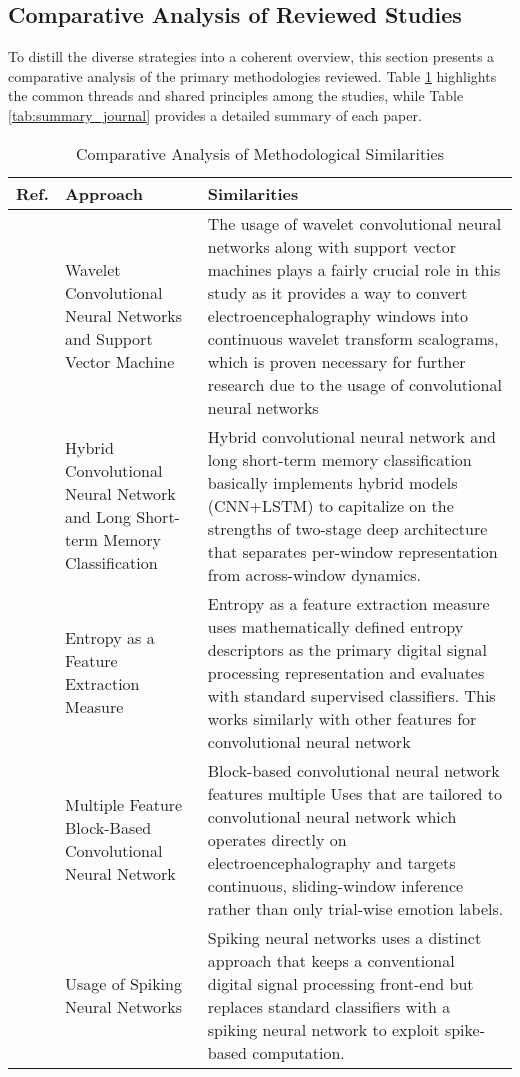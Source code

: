 \documentclass[conference]{IEEEtran}
\begin{document}
\subsection{Comparative Analysis of Reviewed Studies}
To distill the diverse strategies into a coherent overview, this section presents a comparative analysis of the primary methodologies reviewed. Table \ref{tab:method_similarities} highlights the common threads and shared principles among the studies, while Table \ref{tab:summary_journal} provides a detailed summary of each paper.

\begin{table}[htbp]
\centering
\scriptsize
\caption{Comparative Analysis of Methodological Similarities}
\label{tab:method_similarities}
\renewcommand{\arraystretch}{2}
\begin{tabular}{p{1.5cm}p{2.5cm}p{4cm}}
\hline
\textbf{Ref.} & \textbf{Approach} & \textbf{Similarities} \\
\hline
\textbf{\cite{b1}}
& Wavelet Convolutional Neural Networks and Support Vector Machine
& The usage of wavelet convolutional neural networks along with support vector machines plays a fairly crucial role in this study as it provides a way to convert electroencephalography windows into continuous wavelet transform scalograms, which is proven necessary for further research due to the usage of convolutional neural networks \\[1mm]
\textbf{\cite{b2}}
& Hybrid Convolutional Neural Network and Long Short-term Memory Classification
& Hybrid convolutional neural network and long short-term memory classification basically implements hybrid models (CNN+LSTM) to capitalize on the strengths of two-stage deep architecture that separates per-window representation from across-window dynamics. \\[1mm]
\textbf{\cite{b3}}
& Entropy as a Feature Extraction Measure
& Entropy as a feature extraction measure uses mathematically defined entropy descriptors as the primary digital signal processing representation and evaluates with standard supervised classifiers. This works similarly with other features for convolutional neural network\\[1mm]
\textbf{\cite{b4}}
& Multiple Feature Block-Based Convolutional Neural Network
& Block-based convolutional neural network features multiple Uses that are tailored to convolutional neural network which operates directly on electroencephalography and targets continuous, sliding-window inference rather than only trial-wise emotion labels. \\[1mm]
\textbf{\cite{b5}}
& Usage of Spiking Neural Networks
& Spiking neural networks uses a distinct approach that keeps a conventional digital signal processing front-end but replaces standard classifiers with a spiking neural network to exploit spike-based computation. \\[1mm]
\hline
\end{tabular}
\end{table}
\end{document}
